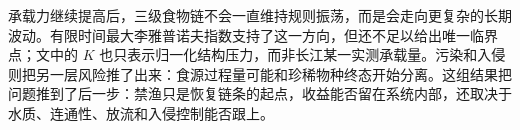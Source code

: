 承载力继续提高后，三级食物链不会一直维持规则振荡，而是会走向更复杂的长期波动。有限时间最大李雅普诺夫指数支持了这一方向，但还不足以给出唯一临界点；文中的 $K$ 也只表示归一化结构压力，而非长江某一实测承载量。污染和入侵则把另一层风险推了出来：食源过程量可能和珍稀物种终态开始分离。这组结果把问题推到了后一步：禁渔只是恢复链条的起点，收益能否留在系统内部，还取决于水质、连通性、放流和入侵控制能否跟上。
